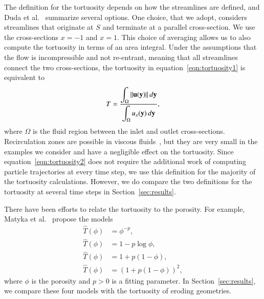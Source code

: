 \documentclass[preprint,10pt]{elsarticle}
\begin{document}
The definition for the tortuosity depends on how the streamlines are
defined, and Duda et al.~\cite{dud-koz-mat2011} summarize several
options. One choice, that we adopt, considers streamlines that originate
at $S$ and terminate at a parallel cross-section.  We use the
cross-sections $x=-1$ and $x=1$.  This choice of averaging allows us to
also compute the tortuosity in terms of an area integral.  Under the
assumptions that the flow is incompressible and not re-entrant, meaning
that all streamlines connect the two cross-sections, the tortuosity in
equation~\eqref{eqn:tortuosity1} is equivalent to~\cite{dud-koz-mat2011}
\begin{align}
  T = \frac{\displaystyle\int_\Omega \|{\mathbf{u}}({\mathbf{y}})\|\, d{\mathbf{y}}}
           {\displaystyle\int_\Omega u_x({\mathbf{y}})\, d{\mathbf{y}}},
  \label{eqn:tortuosity2}
\end{align}
where $\Omega$ is the fluid region between the inlet and outlet
cross-sections.  Recirculation zones are possible in viscous
fluids~\cite{hig1985}, but they are very small in the examples we
consider and have a negligible effect on the tortuosity.  Since
equation~\eqref{eqn:tortuosity2} does not require the additional work of
computing particle trajectories at every time step, we use this
definition for the majority of the tortuosity calculations.  However, we
do compare the two definitions for the tortuosity at several time steps
in Section~\ref{sec:results}.

There have been efforts to relate the tortuosity to the porosity.  For
example, Matyka et al.~\cite{mat-kha-koz2008} propose the models
\begin{subequations}
  \label{eqn:tortuosityModels}
  \begin{align}
    \widehat{T}(\phi) &= \phi^{-p}, \\
    \widehat{T}(\phi) &= 1-p \log \phi, \\
    \widehat{T}(\phi) &= 1+p (1-\phi), \\
    \widehat{T}(\phi) &= (1+p (1-\phi))^2, 
  \end{align}
\end{subequations}
where $\phi$ is the porosity and $p>0$ is a fitting parameter.  In
Section~\ref{sec:results}, we compare these four models with the
tortuosity of eroding geometries.

\end{document}
